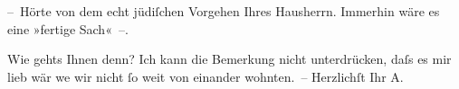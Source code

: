 \pstart
           – Hörte von dem echt jüdiſchen Vorgehen Ihres Hausherrn. Immerhin wäre es eine »fertige Sach« –.\pend
           
\pstart
           Wie gehts Ihnen denn? Ich kann die Bemerkung nicht unterdrücken, daſs es mir lieb wär
                  we{\geminationn} wir nicht ſo weit von einander wohnten. –
               Herzlichſt Ihr \spacefill\mbox{A.}\pend
           \endnumbering{}  
      